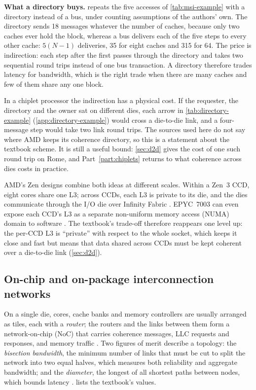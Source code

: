 \textbf{What a directory buys.}  repeats the five accesses of \cref{tab:msi-example} with a directory instead of a bus, under counting assumptions of the authors' own. The directory sends 18 messages whatever the number of caches, because only two caches ever hold the block, whereas a bus delivers each of the five steps to every other cache: $5(N-1)$ deliveries, 35 for eight caches and 315 for 64. The price is indirection: each step after the first passes through the directory and takes two sequential round trips instead of one bus transaction. A directory therefore trades latency for bandwidth, which is the right trade when there are many caches and few of them share any one block.

In a chiplet processor the indirection has a physical cost. If the requester, the directory and the owner sat on different dies, each arrow in \cref{tab:directory-example} (\cref{app:directory-example}) would cross a die-to-die link, and a four-message step would take two link round trips. The sources used here do not say where AMD keeps its coherence directory, so this is a statement about the textbook scheme. It is still a useful bound: \cref{sec:d2d} gives the cost of one such round trip on Rome, and Part~\ref{part:chiplets} returns to what coherence across dies costs in practice.

AMD's Zen designs combine both ideas at different scales. Within a Zen~3 CCD, eight cores share one L3; across CCDs, each L3 is private to its die, and the dies communicate through the I/O die over Infinity Fabric \cite{amd2022epyc7003}. EPYC~7003 can even expose each CCD's L3 as a separate non-uniform memory access (NUMA) domain to software \cite{amd2022epyc7003}. The textbook's trade-off therefore reappears one level up: the per-CCD L3 is ``private'' with respect to the whole socket, which keeps it close and fast but means that data shared across CCDs must be kept coherent over a die-to-die link (\cref{sec:d2d}).

\subsection{On-chip and on-package interconnection networks}
On a single die, cores, cache banks and memory controllers are usually arranged as tiles, each with a \emph{router}; the routers and the links between them form a network-on-chip (NoC) that carries coherence messages, LLC requests and responses, and memory traffic \cite[sec.~12.6.1]{sarangi2025basic}. Two figures of merit describe a topology: the \emph{bisection bandwidth}, the minimum number of links that must be cut to split the network into two equal halves, which measures both reliability and aggregate bandwidth; and the \emph{diameter}, the longest of all shortest paths between nodes, which bounds latency \cite[sec.~12.6.2]{sarangi2025basic}.  lists the textbook's values.

